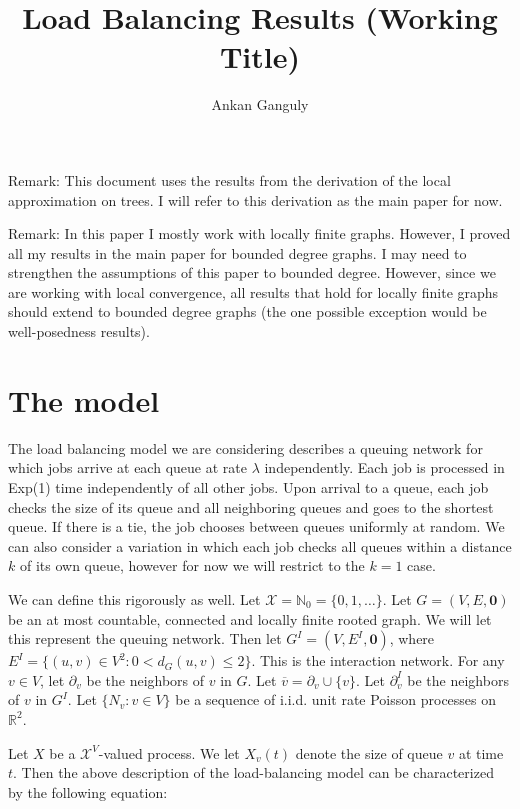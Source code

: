 \documentclass[12pt]{article}
\newcommand{\skipLine}{\vspace{12pt}}
\newcommand{\mb}{\mathbb}
\newcommand{\mc}{\mathcal}
\newcommand{\ov}{\overline}
\newcommand{\ind}{\hspace{24pt}}
\newcommand{\Xf}{X}									%
\newcommand{\vcomp}[1]{_{#1}}						%
\newcommand{\tme}[1]{(#1)}							%
\newcommand{\stte}{\mc{X}}							%
\newcommand{\arr}{\lambda}							%
\newcommand{\poiss}{N}								%
\newcommand{\poissv}[1]{_{#1}}						%
\newcommand{\neigh}[1]{\partial_{#1}}
\newcommand{\cl}[1]{\ov{#1}}
\renewcommand{\root}{\mathbf{0}}
\newcommand{\inter}[1]{#1^I}
\newcommand{\neighI}[1]{\partial^I_{#1}}
\begin{document}
\title{Load Balancing Results (Working Title)}
\author{Ankan Ganguly}

\maketitle

Remark: This document uses the results from the derivation of the local approximation on trees. I will refer to this derivation as the main paper for now.

\skipLine

Remark: In this paper I mostly work with locally finite graphs. However, I proved all my results in the main paper for bounded degree graphs. I may need to strengthen the assumptions of this paper to bounded degree. However, since we are working with local convergence, all results that hold for locally finite graphs should extend to bounded degree graphs (the one possible exception would be well-posedness results).

\section{The model}
\label{mod}

The load balancing model we are considering describes a queuing network for which jobs arrive at each queue at rate \(\arr\) independently. Each job is processed in Exp(1) time independently of all other jobs. Upon arrival to a queue, each job checks the size of its queue and all neighboring queues and goes to the shortest queue. If there is a tie, the job chooses between queues uniformly at random. We can also consider a variation in which each job checks all queues within a distance \(k\) of its own queue, however for now we will restrict to the \(k=1\) case.

\ind We can define this rigorously as well. Let \(\stte = \mb{N}_0 = \{0,1,\dots\}\). Let \(G = (V,E,\root)\) be an at most countable, connected and locally finite rooted graph. We will let this represent the queuing network. Then let \(\inter{G} = (V,\inter{E},\root)\), where \(\inter{E} = \{(u,v) \in V^2: 0 < d_G(u,v)\leq 2\}\). This is the interaction network. For any \(v \in V\), let \(\neigh{v}\) be the neighbors of \(v\) in \(G\). Let \(\cl{v} = \neigh{v}\cup \{v\}\). Let \(\neighI{v}\) be the neighbors of \(v\) in \(\inter{G}\). Let \(\{\poiss\poissv{v}:v \in V\}\) be a sequence of i.i.d. unit rate Poisson processes on \(\mb{R}^2\).

\ind Let \(\Xf\) be a \(\stte^V\)-valued process. We let \(\Xf\vcomp{v}\tme{t}\) denote the size of queue \(v\) at time \(t\). Then the above description of the load-balancing model can be characterized by the following equation:
\end{document}
